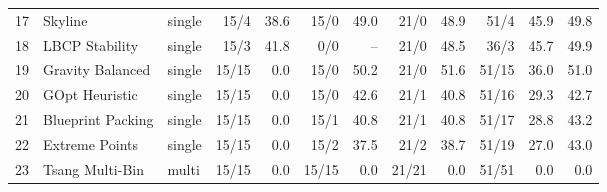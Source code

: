 \begin{table}[htbp]
\begin{tabular}{rllrrrrrrrrr}
17 & Skyline & single & 15/4 & 38.6 & 15/0 & 49.0 & 21/0 & 48.9 & 51/4 & 45.9 & 49.8 \\
18 & LBCP Stability & single & 15/3 & 41.8 & 0/0 & -- & 21/0 & 48.5 & 36/3 & 45.7 & 49.9 \\
19 & Gravity Balanced & single & 15/15 & 0.0 & 15/0 & 50.2 & 21/0 & 51.6 & 51/15 & 36.0 & 51.0 \\
20 & GOpt Heuristic & single & 15/15 & 0.0 & 15/0 & 42.6 & 21/1 & 40.8 & 51/16 & 29.3 & 42.7 \\
21 & Blueprint Packing & single & 15/15 & 0.0 & 15/1 & 40.8 & 21/1 & 40.8 & 51/17 & 28.8 & 43.2 \\
22 & Extreme Points & single & 15/15 & 0.0 & 15/2 & 37.5 & 21/2 & 38.7 & 51/19 & 27.0 & 43.0 \\
23 & Tsang Multi-Bin & multi & 15/15 & 0.0 & 15/15 & 0.0 & 21/21 & 0.0 & 51/51 & 0.0 & 0.0 \\
\bottomrule
\end{tabular}
\end{table}